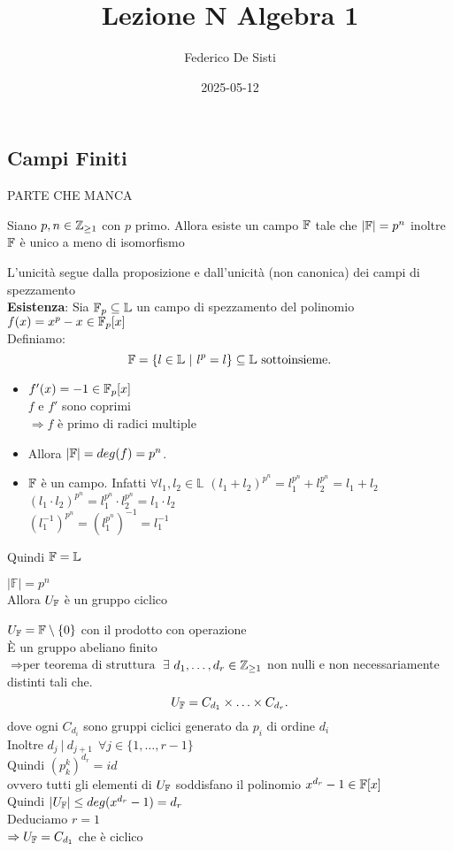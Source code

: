 \documentclass[12px]{article}
\title{Lezione N Algebra 1}
\date{2025-05-12}
\author{Federico De Sisti}
\begin{document}
	\maketitle
	\newpage
	\subsection{Campi Finiti}
	PARTE CHE MANCA\\
	\begin{teo}
		Siano $p,n\in \mathbb{Z}_{\geq 1}$ con  $p$ primo. Allora esiste un campo $\mathbb{F}$ tale che $|\mathbb{F}| = p^n$ inoltre  $\mathbb{F}$ è unico a meno di isomorfismo
	\end{teo}
	\begin{dimo}
		L'unicità segue dalla proposizione e dall'unicità (non canonica)	dei campi di spezzamento\\
		\textbf{Esistenza}: Sia $\mathbb{F}_p\subseteq\mathbb L$ un campo di spezzamento del polinomio  $f(x) = x^p-x\in\mathbb{F}_p[x]$\\
		Definiamo:
		\[
			\mathbb{F} = \{l\in \mathbb L\ | \ l^p = l\}\subseteq\mathbb L\text{ sottoinsieme}
		.\] 
		\begin{itemize}
			\item $f'(x) = -1\in \mathbb{F}_p[x]$ \\
				 $f$ e $f'$ sono coprimi\\
				 $ \Rightarrow  f $ è primo di radici multiple
			 \item Allora $|\mathbb{F}| = deg(f) = p^n$.
			 \item  $\mathbb{F}$ è un campo. Infatti $\forall l_1,l_2\in \mathbb L$ $(l_1 + l_2)^{p^n} = l_1^{p^n} + l_2^{p^n} = l_1 + l_2$\\
				 $(l_1\cdot l_2)^{p^n} = l_1^{p^n}\cdot l_2^{p^n} = l_1 \cdot l_2$\\
				 $(l_1^{-1})^{p^n} = (l_1^{p^n})^{-1} = l_1^{-1}$
		\end{itemize}
		Quindi $\mathbb{F} = \mathbb L$
	\end{dimo}
	\begin{teo}
		$|\mathbb F| = p^n$\\
		Allora  $ U_{\mathbb{F}}$ è un gruppo ciclico
	\end{teo}
	\begin{dimo}
		$U_{\mathbb{F}}= \mathbb{F}\setminus \{0\}$ con il prodotto con operazione\\
		È un gruppo abeliano finito \\
		$ \Rightarrow{\text{per teorema di struttura}} $ $\exists $ $d_1,\ldots,d_r\in \mathbb{Z}_{\geq 1}$ non nulli e non necessariamente distinti tali che.
		\[
			U_{\mathbb{F}} = C_{d_1}\times\ldots\times C_{d_r}
		.\] 
		dove ogni $C_{d_i}$ sono gruppi ciclici generato da  $p_i$ di ordine $d_i$ \\
		Inoltre  $d_j\ |\ d_{j+1}\ \ \forall j\in \{1,\ldots,r-1\}$\\
		Quindi  $(p_k^k)^{d_r}= id$\\
		ovvero tutti gli elementi di  $U_{\mathbb{F}}$ soddisfano il polinomio  $x^{d_r} - 1\in \mathbb{F}[x]$\\
		Quindi  $|U_{\mathbb{F}}| \leq deg(x^{d_r}-1) = d_r$\\
		Deduciamo  $r = 1$\\
		$ \Rightarrow  U_{\mathbb{F}} = C_{d_1}$ che è ciclico
	\end{dimo}
\end{document}

